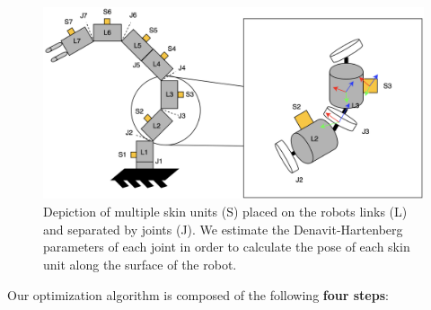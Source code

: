 \begin{figure}[htbp]
    \caption[Calibration theory]{
        Depiction of multiple skin units (S) placed on the robots links (L) and separated by joints (J).
        We estimate the Denavit-Hartenberg parameters of each joint in order to calculate the pose of each skin unit along the surface of the robot.
    }
    \begin{center}
    \includegraphics[width=140mm]{figs/calibration_theory.png}
    \end{center}
\label{fig:calibration_theory}
\end{figure}

Our optimization algorithm is composed of the following \textbf{four steps}:

